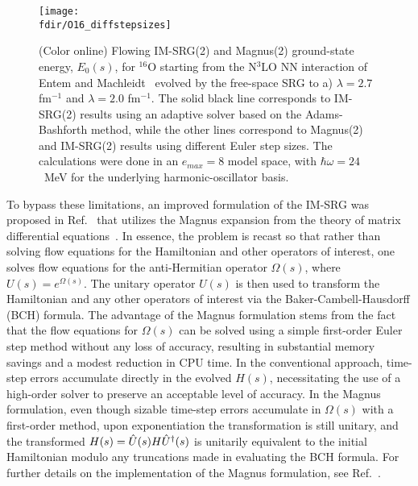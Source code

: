 \begin{figure}[t]
\begin{center}
\texttt{[image: \\fdir/O16\_diffstepsizes]}
\caption{\label{fig:timestep_O16}
(Color online) Flowing IM-SRG(2) and Magnus(2) ground-state energy, 
$E_0(s)$, for $^{16}$O starting from the N$^3$LO NN interaction of
Entem and Machleidt~\cite{Entem:2003th,Machleidt:2011bh} evolved by
the free-space SRG to a) $\lambda=2.7$ fm$^{-1}$ and $\lambda = 2.0$
fm$^{-1}$. The solid black line corresponds to IM-SRG(2) results using
an adaptive solver based on the Adams-Bashforth method, while the
other lines correspond to Magnus(2) and IM-SRG(2) results using
different Euler step sizes. The calculations were done in an
$e_{max}=8$ model space, with $\hbar\omega = 24$~MeV for the
underlying harmonic-oscillator basis.}
\end{center}
\end{figure}

To bypass these limitations, an improved formulation of the IM-SRG was
proposed in Ref.~\cite{Morris:2015ve} that utilizes the Magnus
expansion from the theory of matrix differential
equations~\cite{Magnus:1954xy,Blanes:2009fk}.  In essence, the problem
is recast so that rather than solving flow equations for the
Hamiltonian and other operators of interest, one solves flow equations
for the anti-Hermitian operator $\Omega(s)$, where $U(s) =
e^{\Omega(s)}$. The unitary operator $U(s)$ is then used to transform
the Hamiltonian and any other operators of interest via the
Baker-Cambell-Hausdorff (BCH) formula. The advantage of the Magnus
formulation stems from the fact that the flow equations for
$\Omega(s)$ can be solved using a simple first-order Euler step method
without any loss of accuracy, resulting in substantial memory savings
and a modest reduction in CPU time.  In the conventional approach,
time-step errors accumulate directly in the evolved $H(s)$,
necessitating the use of a high-order solver to preserve an acceptable
level of accuracy.  In the Magnus formulation, even though sizable
time-step errors accumulate in $\Omega(s)$ with a first-order method, 
upon exponentiation the transformation is still unitary, and
the transformed $H(s)=\hat{U}(s)H\hat{U}^\dag(s)$ is unitarily equivalent to
the initial Hamiltonian modulo any truncations made in evaluating the BCH formula.  For
further details on the implementation of the Magnus formulation, see
Ref.~\cite{Morris:2015ve}.

